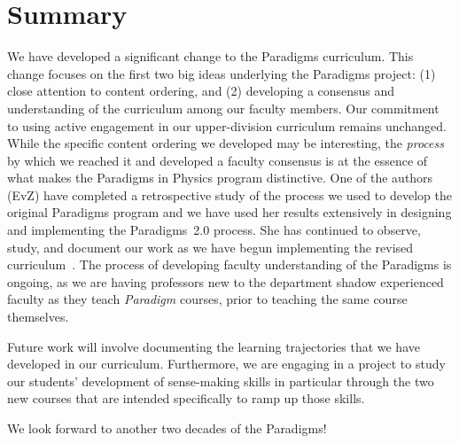 \documentclass[english,aps,pra,reprint,noshowpacs,superscriptaddress]{revtex4-1}
\begin{document}
\section{Summary}
We have developed a significant change to the Paradigms
curriculum.  This change focuses on the first two big ideas underlying
the Paradigms project: (1) close attention to content ordering, and (2)
developing a consensus and understanding of the curriculum among our
faculty members.  Our commitment to using active engagement in our
upper-division curriculum remains unchanged.  While the specific
content ordering we developed may be interesting, the \emph{process} by
which we reached it and developed a faculty consensus is at the
essence of what makes the Paradigms in Physics program distinctive.
One of the authors (EvZ) have completed a retrospective study of the 
process we used to develop the 
original Paradigms program and we have used her results extensively in 
designing and implementing the Paradigms~2.0 process.  She has continued 
to observe, study, and document our work as we have begun implementing 
the revised curriculum~\cite{lessonslearned}.
The process of developing faculty understanding of the Paradigms is
ongoing, as we are having professors new to the department shadow
experienced faculty as they teach \emph{Paradigm} courses, prior to teaching
the same course themselves.  

Future work will involve documenting the learning trajectories that we
have developed in our curriculum.  Furthermore, we are engaging in a
project to study our students' development of sense-making skills in
particular through the two new courses that are intended specifically
to ramp up those skills.

We look forward to another two decades of the Paradigms!




\end{document}
